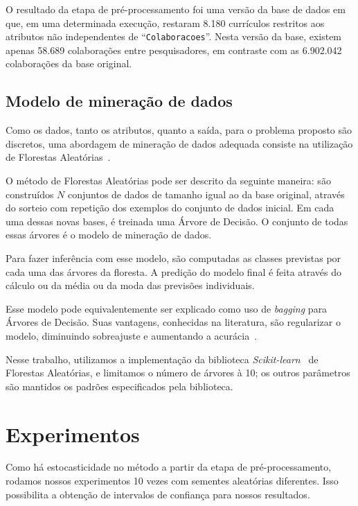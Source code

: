 \documentclass[12pt]{article}
\begin{document}
O resultado da etapa de pré-processamento foi uma versão da base de dados em que, em uma determinada execução, restaram 8.180 currículos restritos aos atributos não independentes de ``\texttt{Colaboracoes}''.
Nesta versão da base, existem apenas 58.689 colaborações entre pesquisadores, em contraste com as 6.902.042 colaborações da base original.


\subsection{Modelo de mineração de dados}
\label{sec:datamining}

Como os dados, tanto os atributos, quanto a saída, para o problema proposto são discretos, uma abordagem de mineração de dados adequada consiste na utilização de Florestas Aleatórias~\cite{random-forests}.

O método de Florestas Aleatórias pode ser descrito da seguinte maneira: são construídos $N$ conjuntos de dados de tamanho igual ao da base original, através do sorteio com repetição dos exemplos do conjunto de dados inicial.
Em cada uma dessas novas bases, é treinada uma Árvore de Decisão.
O conjunto de todas essas árvores é o modelo de mineração de dados.

Para fazer inferência com esse modelo, são computadas as classes previstas por cada uma das árvores da floresta.
A predição do modelo final é feita através do cálculo ou da média ou da moda das previsões individuais.

Esse modelo pode equivalentemente ser explicado como uso de \emph{bagging} para Árvores de Decisão.
Suas vantagens, conhecidas na literatura, são regularizar o modelo, diminuindo sobreajuste e aumentando a acurácia~\cite{random-forests}.

Nesse trabalho, utilizamos a implementação da biblioteca \emph{Scikit-learn}~\cite{sklearn} de Florestas Aleatórias, e limitamos o número de árvores à 10; os outros parâmetros são mantidos os padrões especificados pela biblioteca.

\section{Experimentos}
\label{sec:experiments}

Como há estocasticidade no método a partir da etapa de pré-processamento, rodamos nossos experimentos 10 vezes com sementes aleatórias diferentes.
Isso possibilita a obtenção de intervalos de confiança para nossos resultados.
\end{document}
